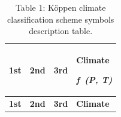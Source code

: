 \documentclass[
]{article}
\begin{document}
\begin{longtable}[]{@{}
  >{\centering\arraybackslash}p{}
  >{\raggedright\arraybackslash}p{}
  >{\raggedright\arraybackslash}p{}
  >{\raggedright\arraybackslash}p{}@{}}
\caption{Table 1: Köppen climate classification scheme symbols
description table.}\tabularnewline
\toprule\noalign{}
\begin{minipage}[b]{\linewidth}\centering
\textbf{1st}
\end{minipage} & \begin{minipage}[b]{\linewidth}\centering
\textbf{2nd}
\end{minipage} & \begin{minipage}[b]{\linewidth}\centering
\textbf{3rd}
\end{minipage} & \begin{minipage}[b]{\linewidth}\centering
\textbf{Climate}

\emph{f~(P, T)}
\end{minipage} \\
\midrule\noalign{}
\endfirsthead
\toprule\noalign{}
\begin{minipage}[b]{\linewidth}\centering
\textbf{1st}
\end{minipage} & \begin{minipage}[b]{\linewidth}\centering
\textbf{2nd}
\end{minipage} & \begin{minipage}[b]{\linewidth}\centering
\textbf{3rd}
\end{minipage} & \begin{minipage}[b]{\linewidth}\centering
\textbf{Climate}


\end{minipage}
\end{longtable}
\end{document}
